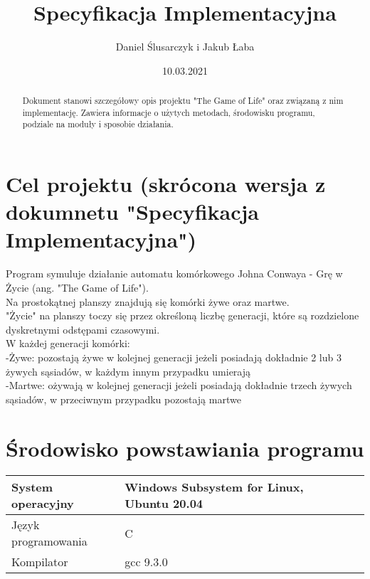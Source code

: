 \documentclass[11pt,a4paper]{report}
\title{\Huge Specyfikacja Implementacyjna}
\author{Daniel Ślusarczyk i Jakub Łaba}
\date{10.03.2021}
\begin{document}
\maketitle

\renewcommand*\thesection{\arabic{section}} 

\begin{abstract}
Dokument stanowi szczegółowy opis projektu "The Game of Life" oraz związaną z nim implementację. Zawiera informacje o użytych metodach, środowisku programu,
podziale na moduły i sposobie działania.
\end{abstract}

\pagestyle{fancy}
\fancyhf{}
\setcounter{page}{0}

{
\fancyhead{} 
\fancyfoot{} 
}
\thispagestyle{empty} 
\tableofcontents 
\thispagestyle{empty}
\newpage

{
\fancyhead{} 
\fancyfoot[C]{\thepage}
}

\section{Cel projektu (skrócona wersja z dokumnetu "Specyfikacja Implementacyjna")}\label{sec:tekst}
Program symuluje działanie automatu komórkowego Johna Conwaya - Grę w Życie (ang. "The Game of Life").\\
Na prostokątnej planszy znajdują się komórki żywe oraz martwe.\\
"Życie" na planszy toczy się przez określoną liczbę generacji, które są rozdzielone dyskretnymi odstępami czasowymi.\\
W każdej generacji komórki:\\
	-Żywe: pozostają żywe w kolejnej generacji jeżeli posiadają dokładnie 2 lub 3 żywych sąsiadów, w każdym innym przypadku umierają\\
	-Martwe: ożywają w kolejnej generacji jeżeli posiadają dokładnie trzech żywych sąsiadów, w przeciwnym przypadku pozostają martwe\\


\section{Środowisko powstawiania programu}\label{sec:teskt}
\begin{tabularx}{\textwidth}{  X|Xl  }
\hline
			System operacyjny		&Windows Subsystem for Linux, Ubuntu 20.04\\
\hline
			Język programowania	&C\\
\hline
			Kompilator			&gcc 9.3.0\\
\end{tabularx}
\end{document}

